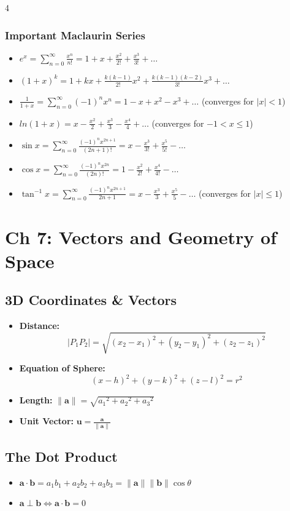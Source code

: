 \documentclass[8pt, landscape, a4paper]{scrartcl}
\begin{document}
\begin{multicols*}{4}
\subsubsection*{Important Maclaurin Series}
\begin{itemize}
    \item $e^x = \sum_{n=0}^{\infty} \frac{x^n}{n!} = 1 + x + \frac{x^2}{2!} + \frac{x^3}{3!} + \dots$
    \item $(1+x)^k = 1 + kx + \frac{k(k-1)}{2!}x^2 + \frac{k(k-1)(k-2)}{3!}x^3 + \dots$
    \item $\frac{1}{1+x} = \sum_{n=0}^{\infty} (-1)^n x^n = 1 - x + x^2 - x^3 + \dots$ (converges for $|x| < 1$)
    \item $ln(1+x) = x - \frac{x^2}{2} + \frac{x^3}{3} - \frac{x^4}{4} + \dots$ (converges for $-1 < x \leq 1$)
    \item $\sin x = \sum_{n=0}^{\infty} \frac{(-1)^n x^{2n+1}}{(2n+1)!} = x - \frac{x^3}{3!} + \frac{x^5}{5!} - \dots$
    \item $\cos x = \sum_{n=0}^{\infty} \frac{(-1)^n x^{2n}}{(2n)!} = 1 - \frac{x^2}{2!} + \frac{x^4}{4!} - \dots$
    \item $\tan^{-1} x = \sum_{n=0}^{\infty} \frac{(-1)^n x^{2n+1}}{2n+1} = x - \frac{x^3}{3} + \frac{x^5}{5} - \dots$ (converges for $|x| \leq 1$)
\end{itemize}

\section*{Ch 7: Vectors and Geometry of Space}
\subsection*{3D Coordinates \& Vectors}
\begin{itemize}
    \item \textbf{Distance:} \[|P_1 P_2| = \sqrt{{(x_2-x_1)}^2 + {(y_2-y_1)}^2 + {(z_2-z_1)}^2}\]
    \item \textbf{Equation of Sphere:} \[{(x-h)}^2 + {(y-k)}^2 + {(z-l)}^2 = r^2\]
    \item \textbf{Length:} $\lVert\mathbf{a}\rVert = \sqrt{{a_1}^2 + {a_2}^2 + {a_3}^2}$
    \item \textbf{Unit Vector:} $\mathbf{u} = \frac{\mathbf{a}}{\lVert\mathbf{a}\rVert}$
\end{itemize}

\subsection*{The Dot Product}
\begin{itemize}
    \item $\mathbf{a} \cdot \mathbf{b} = a_1 b_1 + a_2 b_2 + a_3 b_3 = \lVert\mathbf{a}\rVert \lVert\mathbf{b}\rVert \cos \theta$
    \item $\mathbf{a} \perp \mathbf{b} \iff \mathbf{a} \cdot \mathbf{b} = 0$
\end{itemize}


\end{multicols*}
\end{document}
